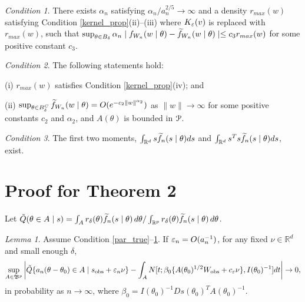 \documentclass[9pt]{article}
\theoremstyle{remark}
\newtheorem{lemma}{Lemma}
\newtheorem{condition}{Condition}
\newcommand{\ST}[1]{{\color{blue}{#1}}}
\begin{document}
\begin{condition} \label{sum_approx}
	There exists $\alpha_{n}$ satisfying $\alpha_{n}/a_{n}^{2/5}\rightarrow\infty$
	and a density $r_{max}(w)$ satisfying Condition \ref{kernel_prop}(ii)--(iii) where $K_{\varepsilon}(v)$
	is replaced with $r_{max}(w)$, such that $\sup_{\theta\in B_{\delta}}\alpha_{n}\mid f_{W_{n}}(w\mid\theta)-\widetilde{f}_{W_{n}}(w\mid\theta)\mid\leq c_{3}r_{max}(w)$
	for some positive constant $c_{3}$. 
\end{condition}

\begin{condition} \label{sum_approx_tail}
	The following statements hold: 
	
	(i) $r_{max}(w)$ satisfies
	Condition \ref{kernel_prop}(iv); and 
	
	(ii) $\sup_{\theta\in B_{\delta}^{C}}\widetilde{f}_{W_{n}}(w\mid\theta)=O(e^{-c_{2}\|w\|^{\alpha_{2}}})$
	as $\|w\|\rightarrow\infty$ for some positive constants $c_{2}$
	and $\alpha_{2}$, and $A(\theta)$ is bounded in ${\cal P}$. 
\end{condition}

\begin{condition} \label{cond:likelihood_moments}
	The first two moments, $\int_{\mathbb{R}^{d}}s\widetilde{f}_{n}(s\mid\theta)ds$
	and $\int_{\mathbb{R}^d}s^{T}s\widetilde{f}_{n}(s\mid\theta)ds$, exist. 
\end{condition}


\section{Proof for Theorem 2}

\noindent Let $\tilde{Q}(\theta\in A\mid s)=\int_{A}r_{\delta}(\theta)\widetilde{f}_{n}(s\mid\theta)\,d\theta/\int_{\mathbb{R}^{p}}r_{\delta}(\theta)\widetilde{f}_{n}(s\mid\theta)\,d\theta$. %

\begin{lemma}\label{Alemma1} Assume Condition \ref{par_true}--\ref{sum_approx}. If $\varepsilon_{n}=O(a_{n}^{-1})$, for any fixed $\nu\in\mathbb{R}^{d}$
	and small enough $\delta$, 
	\[
	\sup_{A\in\mathfrak{B}^{p}}\left|\tilde{Q}\{a_{n}(\theta-\theta_{0})\in A\mid s_{\rm obs}+\varepsilon_{n}\nu\}-\int_{A}N[t;\beta_{0}\{A(\theta_{0})^{1/2}W_{\rm obs}+c_{\varepsilon}\nu\},I(\theta_{0})^{-1}]dt\right|\rightarrow0,
	\]
	in probability as $n\rightarrow\infty$, where $\beta_{0}=I(\theta_{0})^{-1}Ds(\theta_{0})^{T}A(\theta_{0})^{-1}$.
\end{lemma}
\end{document}

